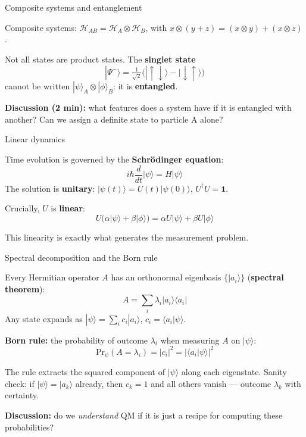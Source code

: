 \documentclass[fleql]{beamer}
\newcommand{\kw}[1]{\textbf{#1}}
\newcommand{\ket}[1]{|#1\rangle}
\newcommand{\bra}[1]{\langle #1|}
\newcommand{\ip}[2]{\langle #1|#2\rangle}
\begin{document}
\begin{frame}{Composite systems and entanglement}

  Composite systems: $\mathcal{H}_{AB} =
  \mathcal{H}_A \otimes \mathcal{H}_B$, with
  $x\otimes(y+z) = (x\otimes y)+(x\otimes z)$.

  \vspace{0.3em}
  Not all states are product states. The \kw{singlet state}
  \[
  \ket{\Psi^-} = \tfrac{1}{\sqrt{2}}
  \bigl(\ket{\uparrow\downarrow} - \ket{\downarrow\uparrow}\bigr)
  \]
  cannot be written $\ket{\psi}_A\otimes\ket{\phi}_B$:
  it is \kw{entangled}.

  \vspace{0.5em}
  \textbf{Discussion (2 min):} what features does a system have
  if it is entangled with another? Can we assign a definite
  state to particle A alone?

\end{frame}

\begin{frame}{Linear dynamics}

  Time evolution is governed by the \kw{Schr\"{o}dinger equation}:
  \[
  i\hbar\frac{d}{dt}\ket{\psi} = H\ket{\psi}
  \]
  The solution is \kw{unitary}: $\ket{\psi(t)} = U(t)\ket{\psi(0)}$,
  \quad $U^\dagger U = \mathbf{1}$.

  \vspace{0.5em}
  Crucially, $U$ is \kw{linear}:
  \[
  U\bigl(\alpha\ket{\psi}+\beta\ket{\phi}\bigr) =
  \alpha U\ket{\psi}+\beta U\ket{\phi}
  \]

  \vspace{0.3em}
  This linearity is exactly what generates the measurement problem.

\end{frame}

\begin{frame}{Spectral decomposition and the Born rule}

  Every Hermitian operator $A$ has an orthonormal eigenbasis
  $\{\ket{a_i}\}$ (\kw{spectral theorem}):
  \[
  A = \sum_i \lambda_i \ket{a_i}\bra{a_i}
  \]
  Any state expands as $\ket{\psi} = \sum_i c_i\ket{a_i}$,
  \quad $c_i = \ip{a_i}{\psi}$.

  \vspace{0.5em}
  \textbf{Born rule:} the probability of outcome $\lambda_i$
  when measuring $A$ on $\ket{\psi}$:
  \[
  \mathrm{Pr}_\psi(A = \lambda_i) = |c_i|^2 = |\ip{a_i}{\psi}|^2
  \]

  \vspace{0.2em}
  \small The rule extracts the squared component of $\ket{\psi}$
  along each eigenstate. Sanity check: if $\ket{\psi}=\ket{a_k}$
  already, then $c_k=1$ and all others vanish --- outcome
  $\lambda_k$ with certainty.

  \vspace{0.3em}
  \normalsize\textbf{Discussion:} do we \emph{understand} QM
  if it is just a recipe for computing these probabilities?

\end{frame}
\end{document}
